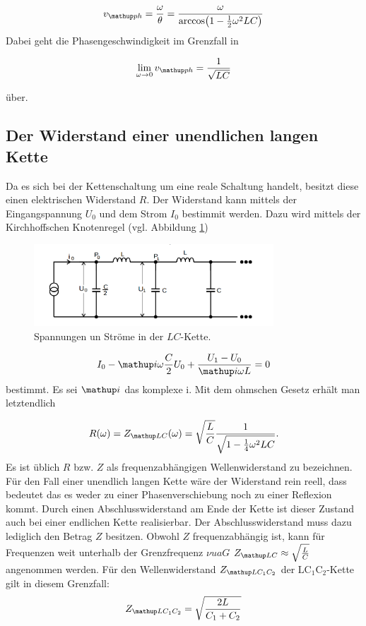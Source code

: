 \begin{equation}
\label{eq:phasen_esc}
v\ua{ph}=\frac{\omega}{\theta}=\frac{\omega}{\arccos\!\left(1-\frac{1}{2}\omega^2LC\right)}
\end{equation}
Dabei geht die Phasengeschwindigkeit im Grenzfall in

\begin{equation*}
\lim_{\omega\to 0}v\ua{ph}=\frac{1}{\sqrt{LC}}
\end{equation*}

über.
\subsection{Der Widerstand einer unendlichen langen Kette}
Da es sich bei der Kettenschaltung um eine reale Schaltung handelt,
besitzt diese einen elektrischen Widerstand $R$.
Der Widerstand kann mittels der Eingangspannung $U_0$ und dem Strom $I_0$ bestimmit werden.
Dazu wird mittels der Kirchhoffschen Knotenregel (vgl. Abbildung \ref{fig:bestimmung_impe}) %
\begin{figure}
  \centering
  \includegraphics[width=0.8\textwidth]{bilder/eigenimpendanz.png}
  \caption{Spannungen un Ströme in der $LC$-Kette.\cite{anleitung356}}
  \label{fig:bestimmung_impe}
\end{figure}
\begin{equation*}
I_0 - \map{i}\omega\frac{C}{2}U_0+\frac{U_1-U_0}{\map{i}\omega L}=0
\end{equation*}
bestimmt.
Es sei $\map{i}$ das komplexe i. %
Mit dem ohmschen Gesetz erhält man letztendlich %

\begin{equation}
R(\omega)=Z\ua{LC}(\omega)=\sqrt{\frac{L}{C}}\frac{1}{\sqrt{1-\frac{1}{4}\omega^2LC}}.
\label{eq: wellenwiderstand_LC}
\end{equation}
Es ist üblich $R$ bzw. $Z$ als frequenzabhängigen Wellenwiderstand zu bezeichnen.
Für den Fall einer unendlich langen Kette wäre der Widerstand rein reell, dass bedeutet %
das es weder zu einer Phasenverschiebung noch zu einer Reflexion kommt.
Durch einen Abschlusswiderstand am Ende der Kette ist dieser Zustand auch bei einer endlichen Kette
realisierbar. Der Abschlusswiderstand muss dazu lediglich den Betrag $Z$ besitzen.
Obwohl $Z$ frequenzabhängig ist, kann für Frequenzen weit unterhalb der Grenzfrequenz $\nu{ua{G}}$
$Z\ua{LC}\approx \sqrt{\frac{L}{C}}$ angenommen werden. Für den Wellenwiderstand $Z\ua{LC_1C_2}$ der $\mathup{LC_1C_2}$-Kette gilt
in diesem Grenzfall:
\begin{equation}
  Z\ua{LC_1C_2} = \sqrt{\frac{2L}{C_1 + C_2}}
  \label{eq: Z_LC_1C_2}
\end{equation}

